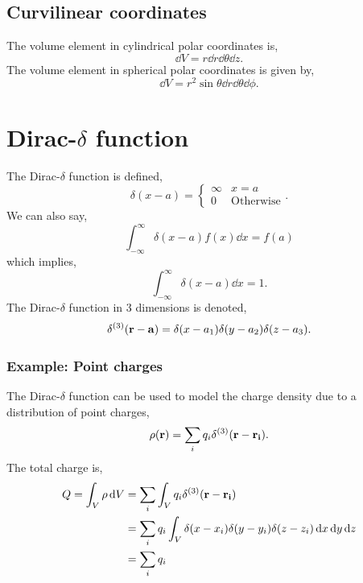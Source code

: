 \documentclass{book}
\begin{document}
\subsection{Curvilinear coordinates}
The volume element in cylindrical polar coordinates is,
\begin{equation}
	\dd{V} = r\dd{r}\dd{\theta}\dd{z}.
\end{equation}
The volume element in spherical polar coordinates is given by,
\begin{equation}
	\dd{V} = r^2\sin\theta\dd{r}\dd{\theta}\dd{\phi}.
\end{equation}
\section{Dirac-$\delta$ function}
The Dirac-$\delta$ function is defined,
\begin{equation}
	\delta(x - a) = \begin{cases}
		\infty & x = a\\
		0 & \text{Otherwise}
	\end{cases}.
\end{equation}
We can also say,
\begin{equation}
	\int_{-\infty}^{\infty}\delta(x-a)f(x)\dd{x} = f(a)
\end{equation}
which implies,
\begin{equation}
	\int_{-\infty}^{\infty}\delta(x-a)\dd{x} = 1.
\end{equation}
The Dirac-$\delta$ function in 3 dimensions is denoted,
\begin{equation}
	\delta^{(3)}(\vb{r}-\vb{a}) = \delta(x - a_1)\delta(y - a_2)\delta(z - a_3).
\end{equation}
\subsubsection{Example: Point charges}
The Dirac-$\delta$ function can be used to model the charge density due to a distribution of point charges,
\begin{equation}
	\rho(\vb{r}) = \sum_i q_i\delta^{(3)}(\vb{r}-\vb{r_i}).
\end{equation}
The total charge is,
\begin{equation}
	\begin{split}
	Q = \int_V \rho \dd{V} &= \sum_i \int_V q_i\delta^{(3)}(\vb{r}-\vb{r_i}) \\
	& = \sum_i q_i\int_V \delta(x - x_i)\delta(y - y_i)\delta(z - z_i)\dd{x}\dd{y}\dd{z} \\
	& = \sum_i q_i
	\end{split}
\end{equation}
\end{document}
